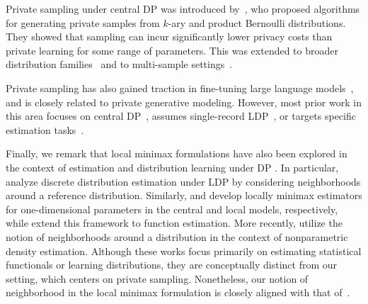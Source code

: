 \documentclass[accepted]{article}
\theoremstyle{plain} %
\theoremstyle{definition}
\theoremstyle{remark}
\begin{document}
Private sampling under central DP was introduced by~\citet{NEURIPS2021_f2b5e92f}, who proposed algorithms for generating private samples from $k$-ary and product Bernoulli distributions. They showed that sampling can incur significantly lower privacy costs than private learning for some range of parameters. This was extended to broader distribution families~\citep{NEURIPS2023_f4eaa4b8,kamath_sampling,tasnim2025reveal} and to multi-sample settings~\citep{MultiSampling}.

Private sampling has also gained traction in fine-tuning large language models~\citep{flemings2024differentially,flemings2024adaptively}, and is closely related to private generative modeling. However, most prior work in this area focuses on central DP~\citep{raskhodnikova2021differentially,ghazi2023differentially,ebadi2016sampling,abay2018privacy,xie2018differentially,xin2020private,torkzadehmahani2019dp,liu2019ppgan}, assumes single-record LDP~\citep{cunningham2022geopointgan,shibata2023local,zhang2023publishing,gwon2024ldp}, or targets specific estimation tasks~\citep{imola2024metric}.

Finally, we remark that local minimax formulations have also been explored in the context of estimation and distribution learning under DP \cite{chen2024lq, mcmillan2022instance, Duchi_Complexity,asi2020instance,feldman2024instance,rohde2020geometrizing}. In particular, \citet{chen2024lq} analyze discrete distribution estimation under LDP by considering neighborhoods around a reference distribution. Similarly, \citet{mcmillan2022instance} and \citet{Duchi_Complexity} develop locally minimax estimators for one-dimensional parameters in the central and local models, respectively, while \citet{asi2020instance} extend this framework to function estimation. More recently, \citet{feldman2024instance} utilize the notion of neighborhoods around a distribution in the context of nonparametric density estimation.
Although these works focus primarily on estimating statistical functionals or learning distributions, they are conceptually distinct from our setting, which centers on private sampling. Nonetheless, our notion of neighborhood in the local minimax formulation is closely aligned with that of~\citet{feldman2024instance}. 

 
\end{document}
